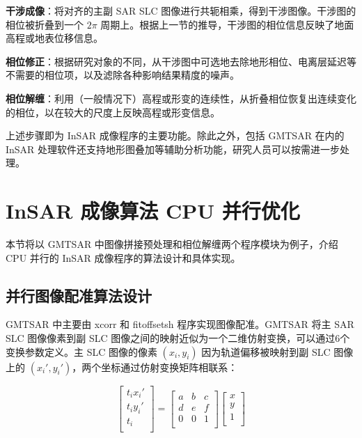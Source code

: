 \textbf{干涉成像}：将对齐的主副 SAR SLC 图像进行共轭相乘，得到干涉图像。干涉图的相位被折叠到一个 $2\pi$ 周期上。根据上一节的推导，干涉图的相位信息反映了地面高程或地表位移信息。

\textbf{相位修正}：根据研究对象的不同，从干涉图中可选地去除地形相位、电离层延迟等不需要的相位项，以及滤除各种影响结果精度的噪声。

\textbf{相位解缠}：利用（一般情况下）高程或形变的连续性，从折叠相位恢复出连续变化的相位，以在较大的尺度上反映高程或形变信息。

上述步骤即为 InSAR 成像程序的主要功能。除此之外，包括 GMTSAR 在内的 InSAR 处理软件还支持地形图叠加等辅助分析功能，研究人员可以按需进一步处理。

\section{InSAR 成像算法 CPU 并行优化}

本节将以 GMTSAR 中图像拼接预处理和相位解缠两个程序模块为例子，介绍 CPU 并行的 InSAR 成像程序的算法设计和具体实现。

\subsection{并行图像配准算法设计}

GMTSAR 中主要由 xcorr 和 fitoffsetsh 程序实现图像配准。GMTSAR 将主 SAR SLC 图像像素到副 SLC 图像之间的映射近似为一个二维仿射变换，可以通过6个变换参数定义。主 SLC 图像的像素 $(x_i, y_i)$ 因为轨道偏移被映射到副 SLC 图像上的 $(x_i', y_i')$，两个坐标通过仿射变换矩阵相联系：

\begin{equation}
\begin{bmatrix}
  t_i x_i' \\
  t_i y_i' \\
  t_i \\
\end{bmatrix}
= \begin{bmatrix}
       a & b & c \\
       d & e & f \\
       0 & 0 & 1 \\
\end{bmatrix}
\begin{bmatrix}
  x \\
  y \\
  1 \\
\end{bmatrix}
\end{equation}

